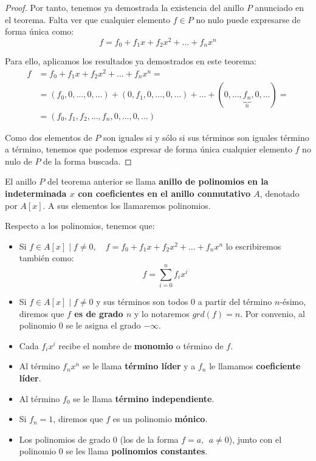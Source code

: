 \begin{proof}
    Por tanto, tenemos ya demostrada la existencia del anillo $P$ anunciado en el teorema. Falta ver que cualquier elemento $f \in P$ no nulo puede expresarse de forma única como:
    $$f = f_0 + f_1x + f_2x^2 + \ldots + f_n x^n$$

    Para ello, aplicamos los resultados ya demostrados en este teorema:
    \begin{equation*}
        \begin{split}
            f
            &= f_0 + f_1x + f_2x^2 + \ldots + f_n x^n = \\
            & = (f_0, 0, \ldots, 0, \ldots) + (0, f_1, 0, \ldots, 0, \ldots) + \ldots + (0, \ldots, \underbrace{f_n}_n, 0, \ldots) = \\
            & = (f_0, f_1, f_2, \ldots, f_n, 0, \ldots, 0, \ldots)
        \end{split}
    \end{equation*}
    
    Como dos elementos de $P$ son iguales si y sólo si sus términos son iguales término a término, tenemos que podemos expresar de forma única cualquier elemento $f$ no nulo de $P$ de la forma buscada.
\end{proof}

\begin{definicion}
    El anillo $P$ del teorema anterior se llama \textbf{anillo de polinomios en la indeterminada $x$ con coeficientes en el anillo conmutativo $A$}, denotado por $A[x]$. A sus elementos los llamaremos polinomios.
\end{definicion}

Respecto a los polinomios, tenemos que:
\begin{itemize}
    \item Si $f \in A[x] \mid f \neq 0 , \quad f = f_0 + f_1x + f_2 x^2 + \ldots + f_n x^n$ lo escribiremos también como:
    $$f = \sum_{i=0}^n f_i x^i$$

    \item Si $f \in A[x] \mid f\neq 0$ y sus términos son todos 0 a partir del término $n$-ésimo, diremos que \textbf{$f$ es de grado $n$} y lo notaremos $grd(f) = n$. Por convenio, al polinomio 0 se le asigna el grado $-\infty$.

    \item Cada $f_i x^i$ recibe el nombre de \textbf{monomio} o término de $f$.

    \item Al término $f_n x^n$ se le llama \textbf{término líder} y a $f_n$ le llamamos \textbf{coeficiente líder}.

    \item  Al término $f_0$ se le llama \textbf{término independiente}.

    \item Si $f_n = 1$, diremos que $f$ es un polinomio \textbf{mónico}.

    \item Los polinomios de grado 0 (los de la forma $f=a,~~a \neq 0$), junto con el polinomio 0 se les llama \textbf{polinomios constantes}.
\end{itemize}

